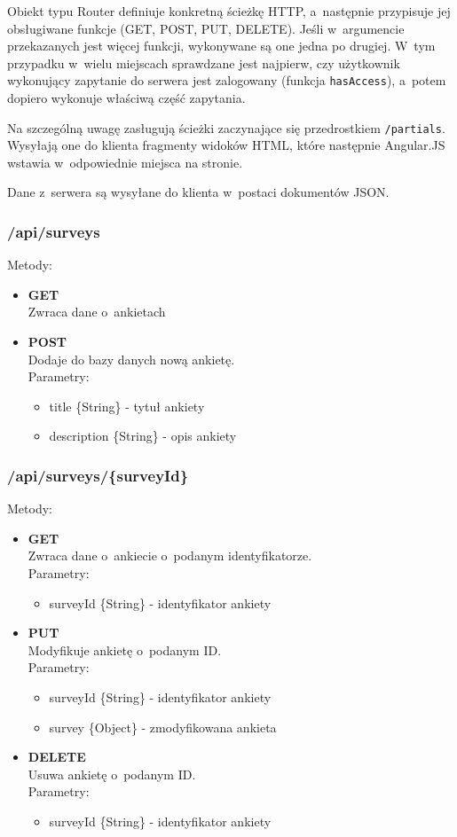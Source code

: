 \documentclass[12pt,a4paper,notitlepage]{article}
\begin{document}
Obiekt typu Router definiuje konkretną ścieżkę HTTP, a~następnie przypisuje jej obsługiwane funkcje (GET, POST, PUT, DELETE). Jeśli w~argumencie przekazanych jest więcej funkcji, wykonywane są one jedna po drugiej. W~tym przypadku w~wielu miejscach sprawdzane jest najpierw, czy użytkownik wykonujący zapytanie do serwera jest zalogowany (funkcja \texttt{hasAccess}), a~potem dopiero wykonuje właściwą część zapytania.
\par Na szczególną uwagę zasługują ścieżki zaczynające się przedrostkiem \texttt{/partials}. Wysyłają one do klienta fragmenty widoków HTML, które następnie Angular.JS wstawia w~odpowiednie miejsca na stronie.
\par Dane z~serwera są wysyłane do klienta w~postaci dokumentów JSON.
\newpage
\subsubsection{/api/surveys}
Metody:
\begin{itemize}
\item \textbf{GET} \\ Zwraca dane o~ankietach 
\item \textbf{POST} \\ Dodaje do bazy danych nową ankietę. \\ Parametry:
	\begin{itemize}
	\item title \{String\} - tytuł ankiety
	\item description \{String\} - opis ankiety
	\end{itemize}
\end{itemize}

\subsubsection{/api/surveys/\{surveyId\}}
Metody:
\begin{itemize}
\item \textbf{GET} \\ Zwraca dane o~ankiecie o~podanym identyfikatorze. \\ Parametry:
	\begin{itemize}
	\item surveyId \{String\} - identyfikator ankiety
	\end{itemize}
\item \textbf{PUT} \\ Modyfikuje ankietę o~podanym ID. \\ Parametry:
	\begin{itemize}
	\item surveyId \{String\} - identyfikator ankiety
	\item survey \{Object\} - zmodyfikowana ankieta
	\end{itemize}

\item \textbf{DELETE} \\ Usuwa ankietę o~podanym ID. \\ Parametry:
	\begin{itemize}
	\item surveyId \{String\} - identyfikator ankiety
	\end{itemize}
\end{itemize}
\newpage
\end{document}
